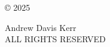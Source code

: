 \begin{center}
\vspace*{7in}

© 2025

Andrew Davis Kerr \\
ALL RIGHTS RESERVED

\end{center}
\clearpage